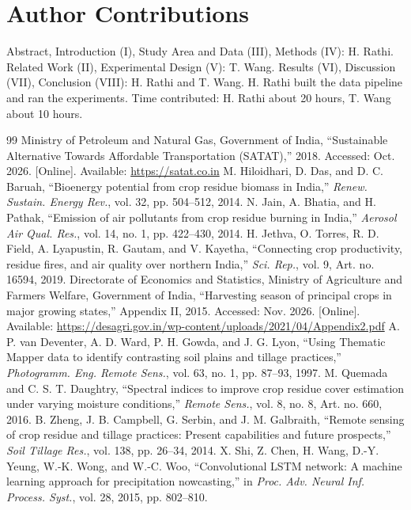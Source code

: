 \documentclass[journal]{IEEEtran}
\begin{document}
\section*{Author Contributions}
Abstract, Introduction (I), Study Area and Data (III), Methods (IV): H. Rathi. Related Work (II), Experimental Design (V): T. Wang. Results (VI), Discussion (VII), Conclusion (VIII): H. Rathi and T. Wang. H. Rathi built the data pipeline and ran the experiments. Time contributed: H. Rathi about 20 hours, T. Wang about 10 hours.

\begin{thebibliography}{99}
 Ministry of Petroleum and Natural Gas, Government of India, ``Sustainable Alternative Towards Affordable Transportation (SATAT),'' 2018. Accessed: Oct. 2026. [Online]. Available: \url{https://satat.co.in}
 M. Hiloidhari, D. Das, and D. C. Baruah, ``Bioenergy potential from crop residue biomass in India,'' \emph{Renew. Sustain. Energy Rev.}, vol. 32, pp. 504--512, 2014.
 N. Jain, A. Bhatia, and H. Pathak, ``Emission of air pollutants from crop residue burning in India,'' \emph{Aerosol Air Qual. Res.}, vol. 14, no. 1, pp. 422--430, 2014.
 H. Jethva, O. Torres, R. D. Field, A. Lyapustin, R. Gautam, and V. Kayetha, ``Connecting crop productivity, residue fires, and air quality over northern India,'' \emph{Sci. Rep.}, vol. 9, Art. no. 16594, 2019.
 Directorate of Economics and Statistics, Ministry of Agriculture and Farmers Welfare, Government of India, ``Harvesting season of principal crops in major growing states,'' Appendix II, 2015. Accessed: Nov. 2026. [Online]. Available: \url{https://desagri.gov.in/wp-content/uploads/2021/04/Appendix2.pdf}
 A. P. van Deventer, A. D. Ward, P. H. Gowda, and J. G. Lyon, ``Using Thematic Mapper data to identify contrasting soil plains and tillage practices,'' \emph{Photogramm. Eng. Remote Sens.}, vol. 63, no. 1, pp. 87--93, 1997.
 M. Quemada and C. S. T. Daughtry, ``Spectral indices to improve crop residue cover estimation under varying moisture conditions,'' \emph{Remote Sens.}, vol. 8, no. 8, Art. no. 660, 2016.
 B. Zheng, J. B. Campbell, G. Serbin, and J. M. Galbraith, ``Remote sensing of crop residue and tillage practices: Present capabilities and future prospects,'' \emph{Soil Tillage Res.}, vol. 138, pp. 26--34, 2014.
 X. Shi, Z. Chen, H. Wang, D.-Y. Yeung, W.-K. Wong, and W.-C. Woo, ``Convolutional LSTM network: A machine learning approach for precipitation nowcasting,'' in \emph{Proc. Adv. Neural Inf. Process. Syst.}, vol. 28, 2015, pp. 802--810.

\end{thebibliography}
\end{document}
